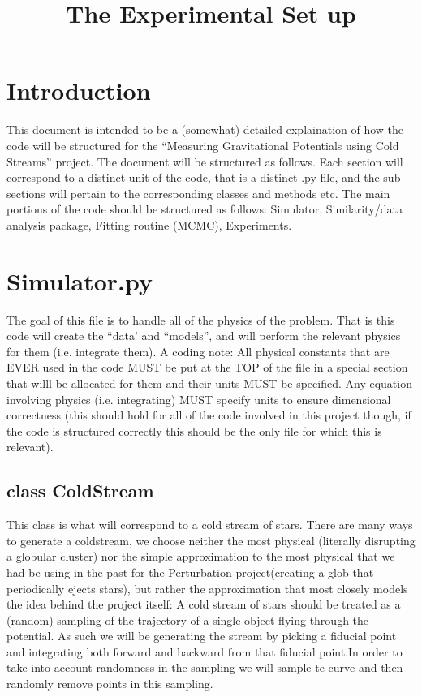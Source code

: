 \documentclass{article}
\title{The Experimental Set up}
\begin{document}
\section{Introduction}

This document is intended to be a (somewhat) detailed explaination of how the code will be structured 
for the ``Measuring Gravitational Potentials using Cold Streams'' project. The document will be structured 
as follows. Each section will correspond to a distinct unit of the code, that is a distinct .py file, and the
sub-sections will pertain to the corresponding classes and methods etc. The main portions of the code should
be structured as follows: Simulator, Similarity/data analysis package, Fitting routine (MCMC), Experiments.



\section{Simulator.py}
The goal of this file is to handle all of the physics of the problem. That is this code will create the 
``data' and ``models'', and will perform the relevant physics for them (i.e. integrate them). A coding
note: All physical constants that are EVER used in the code MUST be put at the TOP of the file in a special
section that willl be allocated for them and their units MUST be specified. Any equation involving 
physics (i.e. integrating) MUST specify units to ensure dimensional correctness (this should hold for all of
the code involved in this project though, if the code is structured correctly this should be the only 
file for which this is relevant).


\subsection{class ColdStream}
This class is what will correspond to a cold stream of stars. There are many ways to generate a coldstream,
we choose neither the most physical (literally disrupting a globular cluster) nor the simple approximation 
to the most physical that we had be using in the past for the Perturbation project(creating a glob that 
periodically ejects stars), but rather the approximation that most closely models the 
idea behind the project itself: A cold stream of stars should be treated as a (random) sampling of the 
trajectory of a single object flying through the potential. As such we will be generating the 
stream by picking a fiducial point and integrating both forward and 
backward from that fiducial point.In order to take into account randomness in the sampling we will sample
te curve and then randomly remove points in this sampling.
\end{document}
